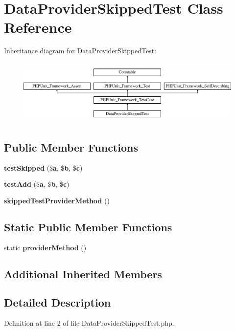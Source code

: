 \section{Data\+Provider\+Skipped\+Test Class Reference}
\label{class_data_provider_skipped_test}
Inheritance diagram for Data\+Provider\+Skipped\+Test\+:\begin{figure}[H]
\begin{center}
\leavevmode
\includegraphics[height=3.303835cm]{class_data_provider_skipped_test}
\end{center}
\end{figure}
\subsection*{Public Member Functions}
\begin{DoxyCompactItemize}
\item 
{\bf test\+Skipped} (\${\bf a}, \${\bf b}, \${\bf c})
\item 
{\bf test\+Add} (\${\bf a}, \${\bf b}, \${\bf c})
\item 
{\bf skipped\+Test\+Provider\+Method} ()
\end{DoxyCompactItemize}
\subsection*{Static Public Member Functions}
\begin{DoxyCompactItemize}
\item 
static {\bf provider\+Method} ()
\end{DoxyCompactItemize}
\subsection*{Additional Inherited Members}


\subsection{Detailed Description}


Definition at line 2 of file Data\+Provider\+Skipped\+Test.\+php.



